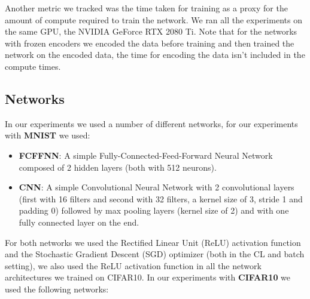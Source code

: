 Another metric we tracked was the time taken for training as a proxy for the amount of compute required to train the network. We ran all the experiments on the same GPU, the NVIDIA GeForce RTX 2080 Ti. Note that for the networks with frozen encoders we encoded the data before training and then trained the network on the encoded data, the time for encoding the data isn't included in the compute times.

\subsection{Networks}
\label{subsec:networks}
In our experiments we used a number of different networks, for our experiments with \textbf{MNIST} we used:
\begin{itemize}
    \item \textbf{FCFFNN}: A simple Fully-Connected-Feed-Forward Neural Network composed of 2 hidden layers (both with 512 neurons).
    \item \textbf{CNN}: A simple  Convolutional Neural Network with 2 convolutional layers (first with 16 filters and second with 32 filters, a kernel size of 3, stride 1 and padding 0) followed by max pooling layers (kernel size of 2) and with one fully connected layer on the end.
\end{itemize}
For both networks we used the Rectified Linear Unit (ReLU) activation function and the Stochastic Gradient Descent (SGD) optimizer (both in the CL and batch setting), we also used the ReLU activation function in all the network architectures we trained on CIFAR10. In our experiments with \textbf{CIFAR10} we used the following networks:
